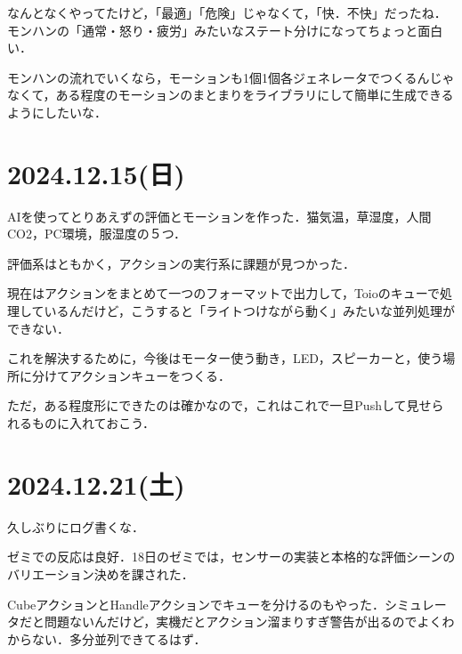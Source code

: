 \documentclass[fleqn,twocolumn]{mynote}
\begin{document}
なんとなくやってたけど，「最適」「危険」じゃなくて，「快．不快」だったね．モンハンの「通常・怒り・疲労」みたいなステート分けになってちょっと面白い．

モンハンの流れでいくなら，モーションも1個1個各ジェネレータでつくるんじゃなくて，ある程度のモーションのまとまりをライブラリにして簡単に生成できるようにしたいな．

\fboxsep=0pt            %
\fboxrule=1pt            %
\begin{figure}[h]
  \centering
  \caption{}
  \label{fig:}
\end{figure}

\section*{2024.12.15(日)}
AIを使ってとりあえずの評価とモーションを作った．猫気温，草湿度，人間CO2，PC環境，服湿度の５つ．

評価系はともかく，アクションの実行系に課題が見つかった．

現在はアクションをまとめて一つのフォーマットで出力して，Toioのキューで処理しているんだけど，こうすると「ライトつけながら動く」みたいな並列処理ができない．

これを解決するために，今後はモーター使う動き，LED，スピーカーと，使う場所に分けてアクションキューをつくる．

ただ，ある程度形にできたのは確かなので，これはこれで一旦Pushして見せられるものに入れておこう．

\section*{2024.12.21(土)}
久しぶりにログ書くな．

ゼミでの反応は良好．18日のゼミでは，センサーの実装と本格的な評価シーンのバリエーション決めを課された．

CubeアクションとHandleアクションでキューを分けるのもやった．シミュレータだと問題ないんだけど，実機だとアクション溜まりすぎ警告が出るのでよくわからない．多分並列できてるはず．
\end{document}
